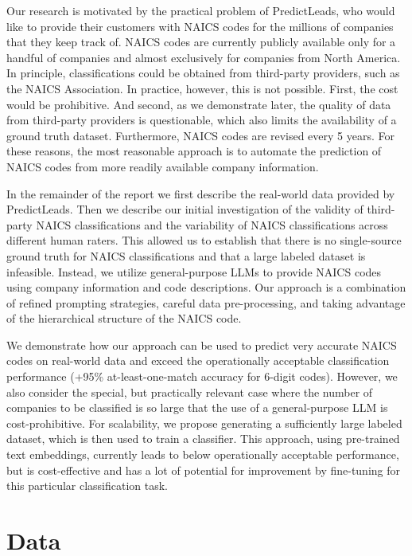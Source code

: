 \documentclass[fleqn,moreauthors,10pt]{ds_report}
\begin{document}
Our research is motivated by the practical problem of PredictLeads, who would like to provide their customers with NAICS codes for the millions of companies that they keep track of. NAICS codes are currently publicly available only for a handful of companies and almost exclusively for companies from North America. In principle, classifications could be obtained from third-party providers, such as the NAICS Association. In practice, however, this is not possible. First, the cost would be prohibitive. And second, as we demonstrate later, the quality of data from third-party providers is questionable, which also limits the availability of a ground truth dataset. Furthermore, NAICS codes are revised every 5 years. For these reasons, the most reasonable approach is to automate the prediction of NAICS codes from more readily available company information.

In the remainder of the report we first describe the real-world data provided by PredictLeads. Then we describe our initial investigation of the validity of third-party NAICS classifications and the variability of NAICS classifications across different human raters. This allowed us to establish that there is no single-source ground truth for NAICS classifications and that a large labeled dataset is infeasible. Instead, we utilize general-purpose LLMs to provide NAICS codes using company information and code descriptions. Our approach is a combination of refined prompting strategies, careful data pre-processing, and taking advantage of the hierarchical structure of the NAICS code.

We demonstrate how our approach can be used to predict very accurate NAICS codes on real-world data and exceed the operationally acceptable classification performance (+95\% at-least-one-match accuracy for 6-digit codes). However, we also consider the special, but practically relevant case where the number of companies to be classified is so large that the use of a general-purpose LLM is cost-prohibitive. For scalability, we propose generating a sufficiently large labeled dataset, which is then used to train a classifier. This approach, using pre-trained text embeddings, currently leads to below operationally acceptable performance, but is cost-effective and has a lot of potential for improvement by fine-tuning for this particular classification task.

\section*{Data}
\end{document}
